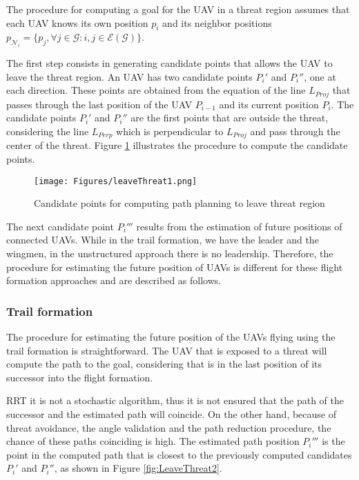 The procedure for computing a goal for the UAV in a threat region assumes that each UAV knows its own position $p_i$ and its neighbor positions $p_{\mathcal{N}_i}=\{p_j,\forall j\in\mathcal{G}: i,j \in \mathcal{E}\left(\mathcal{G}\right)\}$.

The first step consists in generating candidate points that allows the UAV to leave the threat region. An UAV has two candidate points $P_i'$ and $P_i''$, one at each direction. These points are obtained from the equation of the line $L_{Proj}$ that passes through the last position of the UAV $P_{i-1}$ and its current position $P_i$. The candidate points  $P_i'$ and $P_i''$ are the first points that are outside the threat, considering the line $L_{Perp}$ which is perpendicular to $L_{Proj}$ and pass through the center of the threat. Figure \ref{fig:LeaveThreat1} illustrates the procedure to compute the candidate points.

\begin{figure}[hbt!]
\centering
\texttt{[image: Figures/leaveThreat1.png]}
\caption{Candidate points for computing path planning to leave threat region}
\label{fig:LeaveThreat1}
\end{figure}

The next candidate point $P_i'''$ results from the estimation of future positions of connected UAVs. While in the trail formation, we have the leader and the wingmen, in the unstructured approach there is no leadership. Therefore, the procedure for estimating the future position of UAVs is different for these flight formation approaches and are described as follows.

\subsubsection{Trail formation}

The procedure for estimating the future position of the UAVs flying using the trail formation is straightforward. The UAV that is exposed to a threat will compute the path to the goal, considering that is in the last position of its successor into the flight formation. 

RRT it is not a stochastic algorithm, thus it is not ensured that the path of the successor and the estimated path will coincide. On the other hand, because of threat avoidance, the angle validation and the path reduction procedure, the chance of these paths coinciding is high. The estimated path position $P_i'''$ is the point in the computed path that is closest to the previously computed candidates $P_i'$ and $P_i''$, as shown in Figure \ref{fig:LeaveThreat2}.

